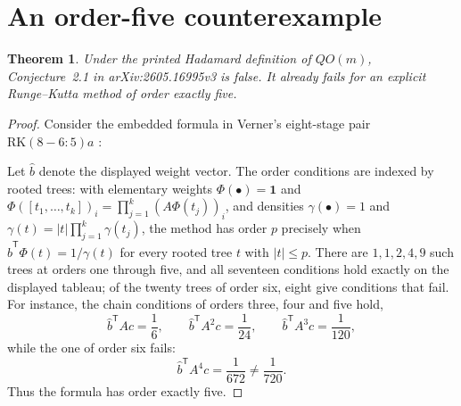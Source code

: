 \documentclass[11pt]{amsart}
\newtheorem{theorem}{Theorem}
\begin{document}
\section{An order-five counterexample}

\begin{theorem}\label{thm:counterexample}
Under the printed Hadamard definition of \(QO(m)\), Conjecture~2.1 in
arXiv:2605.16995v3 is false. It already fails for an explicit
Runge--Kutta method of order exactly five.
\end{theorem}

\begin{proof}
Consider the embedded formula in Verner's eight-stage pair
\(\mathrm{RK}(8\!-\!6{:}5)a\)
\cite[Table~4 and Algorithm~1.2]{Verner2014}:
\begin{center}
\begingroup
\renewcommand{\arraystretch}{1.35}
%
\endgroup
\end{center}

Let \(\widehat b\) denote the displayed weight vector. The order
conditions are indexed by rooted trees: with elementary weights
\(\Phi(\bullet)=\mathbf 1\) and
\(\Phi([t_1,\dots,t_k])_i=\prod_{j=1}^k(A\Phi(t_j))_i\), and densities
\(\gamma(\bullet)=1\) and \(\gamma(t)=|t|\prod_{j=1}^k\gamma(t_j)\), the
method has order \(p\) precisely when
\(\widehat b^{\mathsf T}\Phi(t)=1/\gamma(t)\) for every rooted tree \(t\)
with \(|t|\le p\). There are \(1,1,2,4,9\) such trees at orders one
through five, and all seventeen conditions hold exactly on the displayed
tableau; of the twenty trees of order six, eight give conditions that
fail. For instance, the chain conditions of orders three, four and five
hold,
\[
\widehat b^{\mathsf T}Ac=\frac16,
\qquad
\widehat b^{\mathsf T}A^2c=\frac1{24},
\qquad
\widehat b^{\mathsf T}A^3c=\frac1{120},
\]
while the one of order six fails:
\[
\widehat b^{\mathsf T}A^4c
 =\frac{1}{672}
 \ne\frac{1}{720}.
\]
Thus the formula has order exactly five.


\end{proof}
\end{document}
